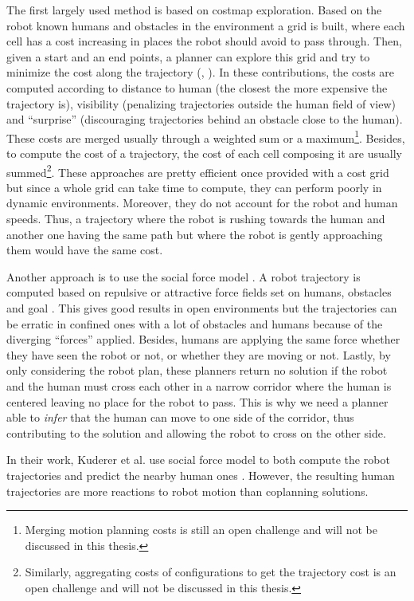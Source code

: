 \documentclass[a4paper,11pt,twoside]{StyleThese}
\begin{document}
The first largely used method is based on costmap exploration. Based on the robot known humans and obstacles in the environment a grid is built, where each cell has a cost increasing in places the robot should avoid to pass through. Then, given a start and an end points, a planner can explore this grid and try to minimize the cost along the trajectory (\cite{sisbot_human_2007}, \cite{lu_towards_2013}). In these contributions, the costs are computed according to distance to human (the closest the more expensive the trajectory is), visibility (penalizing trajectories outside the human field of view) and ``surprise'' (discouraging trajectories behind an obstacle close to the human). These costs are merged usually through a weighted sum or a maximum\footnote{Merging motion planning costs is still an open challenge and will not be discussed in this thesis.}. Besides, to compute the cost of a trajectory, the cost of each cell composing it are usually summed\footnote{Similarly, aggregating costs of configurations to get the trajectory cost is an open challenge and will not be discussed in this thesis.}. These approaches are pretty efficient once provided with a cost grid but since a whole grid can take time to compute, they can perform poorly in dynamic environments. Moreover, they do not account for the robot and human speeds. Thus, a trajectory where the robot is rushing towards the human and another one having the same path but where the robot is gently approaching them would have the same cost.

\smallskip

Another approach is to use the social force model \cite{helbing_social_1995}. A robot trajectory is computed based on repulsive or attractive force fields set on humans, obstacles and goal \cite{ferrer_robot_2013}. This gives good results in open environments but the trajectories can be erratic in confined ones with a lot of obstacles and humans because of the diverging ``forces'' applied. Besides, humans are applying the same force whether they have seen the robot or not, or whether they are moving or not. Lastly, by only considering the robot plan, these planners return no solution if the robot and the human must cross each other in a narrow corridor where the human is centered leaving no place for the robot to pass. This is why we need a planner able to \textit{infer} that the human can move to one side of the corridor, thus contributing to the solution and allowing the robot to cross on the other side.

In their work, Kuderer et al. use social force model to both compute the robot trajectories and predict the nearby human ones \cite{kuderer_feature-based_2012}. However, the resulting human trajectories are more reactions to robot motion than coplanning solutions.
\end{document}
